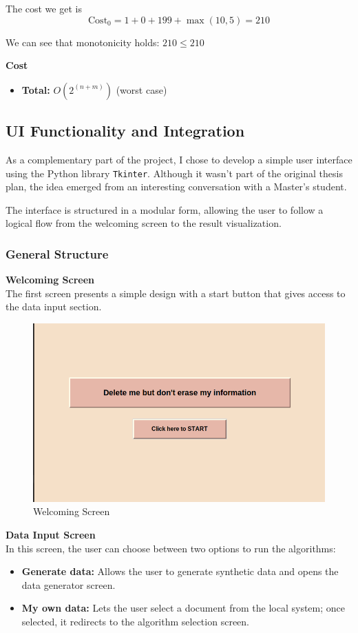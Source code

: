 \documentclass[a4paper,12pt]{article}
\begin{document}
The cost we get is 
\[
\text{Cost}_{\text{0}} = 1 + 0 +199 + \max(10, 5) = 210
\]

We can see that monotonicity holds: $210 \leq 210$

\textbf{Cost}
\begin{itemize}
    \item \textbf{Total:} $O(2^{(n+m)})$ (worst case)
\end{itemize}

\subsection{UI Functionality and Integration}
As a complementary part of the project, I chose to develop a simple user interface using the Python library \texttt{Tkinter}. Although it wasn't part of the original thesis plan, the idea emerged from an interesting conversation with a Master's student.

The interface is structured in a modular form, allowing the user to follow a logical flow from the welcoming screen to the result visualization.

\subsubsection{General Structure}
\textbf{Welcoming Screen} \\
The first screen presents a simple design with a start button that gives access to the data input section.

\begin{figure}[H]
\centering
\includegraphics[width=0.5\linewidth]{Welcome.png}
\caption{Welcoming Screen}
\end{figure}

\textbf{Data Input Screen} \\
In this screen, the user can choose between two options to run the algorithms:
\begin{itemize}
    \item \textbf{Generate data:} Allows the user to generate synthetic data and opens the data generator screen.
    \item \textbf{My own data:} Lets the user select a document from the local system; once selected, it redirects to the algorithm selection screen.
\end{itemize}
\end{document}
